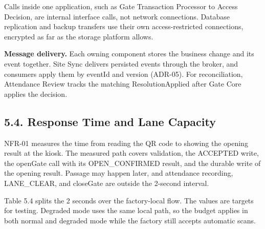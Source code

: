 Calls inside one application, such as Gate Transaction Processor to Access Decision, are internal interface calls, not network connections. Database replication and backup transfers use their own access-restricted connections, encrypted as far as the storage platform allows.

\textbf{Message delivery.} Each owning component stores the business change and its event together. Site Sync delivers persisted events through the broker, and consumers apply them by eventId and version (ADR-05). For reconciliation, Attendance Review tracks the matching ResolutionApplied after Gate Core applies the decision.

\subsection*{5.4. Response Time and Lane Capacity}

{}

NFR-01 measures the time from reading the QR code to showing the opening result at the kiosk. The measured path covers validation, the ACCEPTED write, the openGate call with its OPEN\_CONFIRMED result, and the durable write of the opening result. Passage may happen later, and attendance recording, LANE\_CLEAR, and closeGate are outside the 2-second interval.

Table 5.4 splits the 2 seconds over the factory-local flow. The values are targets for testing. Degraded mode uses the same local path, so the budget applies in both normal and degraded mode while the factory still accepts automatic scans.

